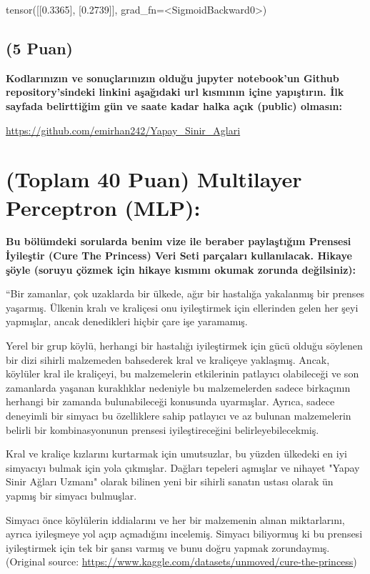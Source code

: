 \documentclass[11pt]{article}
\begin{document}
tensor([[0.3365],
        [0.2739]], grad_fn=<SigmoidBackward0>)

\subsection{(5 Puan)} \textbf{Kodlarınızın ve sonuçlarınızın olduğu jupyter notebook'un Github repository'sindeki linkini aşağıdaki url kısmının içine yapıştırın. İlk sayfada belirttiğim gün ve saate kadar halka açık (public) olmasın:}

\url{https://github.com/emirhan242/Yapay_Sinir_Aglari}

\section{(Toplam 40 Puan) Multilayer Perceptron (MLP):} 
\textbf{Bu bölümdeki sorularda benim vize ile beraber paylaştığım Prensesi İyileştir (Cure The Princess) Veri Seti parçaları kullanılacak. Hikaye şöyle (soruyu çözmek için hikaye kısmını okumak zorunda değilsiniz):} 

``Bir zamanlar, çok uzaklarda bir ülkede, ağır bir hastalığa yakalanmış bir prenses yaşarmış. Ülkenin kralı ve kraliçesi onu iyileştirmek için ellerinden gelen her şeyi yapmışlar, ancak denedikleri hiçbir çare işe yaramamış.

Yerel bir grup köylü, herhangi bir hastalığı iyileştirmek için gücü olduğu söylenen bir dizi sihirli malzemeden bahsederek kral ve kraliçeye yaklaşmış. Ancak, köylüler kral ile kraliçeyi, bu malzemelerin etkilerinin patlayıcı olabileceği ve son zamanlarda yaşanan kuraklıklar nedeniyle bu malzemelerden sadece birkaçının herhangi bir zamanda bulunabileceği konusunda uyarmışlar. Ayrıca, sadece deneyimli bir simyacı bu özelliklere sahip patlayıcı ve az bulunan malzemelerin belirli bir kombinasyonunun prensesi iyileştireceğini belirleyebilecekmiş.

Kral ve kraliçe kızlarını kurtarmak için umutsuzlar, bu yüzden ülkedeki en iyi simyacıyı bulmak için yola çıkmışlar. Dağları tepeleri aşmışlar ve nihayet "Yapay Sinir Ağları Uzmanı" olarak bilinen yeni bir sihirli sanatın ustası olarak ün yapmış bir simyacı bulmuşlar.

Simyacı önce köylülerin iddialarını ve her bir malzemenin alınan miktarlarını, ayrıca iyileşmeye yol açıp açmadığını incelemiş. Simyacı biliyormuş ki bu prensesi iyileştirmek için tek bir şansı varmış ve bunu doğru yapmak zorundaymış. (Original source: \url{https://www.kaggle.com/datasets/unmoved/cure-the-princess})
\end{document}
